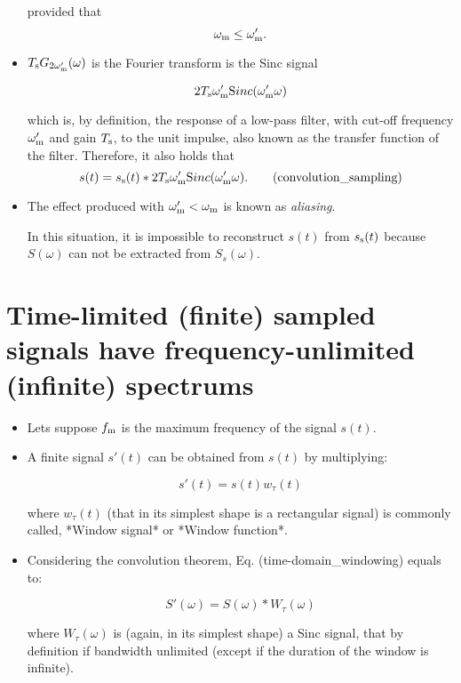 \begin{itemize}

  provided that $$\omega_{\text m}\leq \omega_{\text m}'.$$

\item $T_{\text s}G_{2\omega_{\text m}'}(\omega)$ is the Fourier transform is the Sinc signal

  \begin{equation}
    2T_{\text s}\omega_{\text m}'{\text Sinc}(\omega_{\text m}'\omega)
  \end{equation}

  which is, by definition, the response of a low-pass filter, with cut-off frequency $\omega_{\text m}'$ and gain $T_{\text s}$, to the unit impulse, also known as the transfer function of the filter. Therefore, it also holds that
  \begin{equation}
    s(t) = s_{\text s}(t)*2T_{\text s}\omega_{\text m}'{\text Sinc}(\omega_{\text m}'\omega).
    \tag{convolution\_sampling}
  \end{equation}

\item The effect produced with $\omega_{\text m}' < \omega_{\text m}$ is
  known as \emph{aliasing}.


  In this situation, it is impossible to reconstruct $s(t)$ from $s_{\text s}(t)$ because $S(\omega)$ can not be extracted from $S_s(\omega)$.

\end{itemize}

\section{Time-limited (finite) sampled signals have frequency-unlimited (infinite) spectrums}
\begin{itemize}
\item Lets suppose $f_{\text m}$ is the maximum frequency of the signal $s(t)$.

\item A finite signal $s'(t)$ can be obtained from $s(t)$ by multiplying:

  \begin{equation}
    s'(t) = s(t)w_\tau(t)
    \tag{time-domain\_windowing}
  \end{equation}

  where $w_\tau(t)$ (that in its simplest shape is a rectangular signal) is commonly called, *Window signal* or *Window function*.

\item Considering the convolution theorem, Eq. (time-domain\_windowing) equals to:

  \begin{equation}
    S'(\omega) = S(\omega)*W_\tau(\omega)
    \tag{frequency-domain\_windowing}
  \end{equation}

  where $W_\tau(\omega)$ is (again, in its simplest shape) a Sinc
  signal, that by definition if bandwidth unlimited (except if the
  duration of the window is infinite).
\end{itemize}


